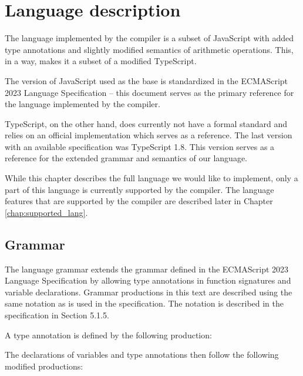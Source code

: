 \chapter{Language description}\label{language}

The language implemented by the compiler is a subset of JavaScript with added type annotations and slightly modified semantics of arithmetic operations. This, in a way, makes it a subset of a modified TypeScript.

The version of JavaScript used as the base is standardized in the ECMAScript 2023 Language Specification\cite{ecma262} -- this document serves as the primary reference for the language implemented by the compiler.

TypeScript, on the other hand, does currently not have a formal standard and relies on an official implementation which serves as a reference. The last version with an available specification was TypeScript 1.8\cite{typescript18}. This version serves as a reference for the extended grammar and semantics of our language.

While this chapter describes the full language we would like to implement, only a part of this language is currently supported by the compiler. The language features that are supported by the compiler are described later in Chapter \ref{chap:supported_lang}.


\section{Grammar}\label{lang:grammar}

The language grammar extends the grammar defined in the ECMAScript 2023 Language Specification\cite{ecma262} by allowing type annotations in function signatures and variable declarations. Grammar productions in this text are described using the same notation as is used in the specification. The notation is described in the specification in Section 5.1.5.

A type annotation is defined by the following production:

\GrammarRule[TypeAnnotation]{}{
    \terminal{:} \nonterminal[Identifier]{}{}
}


The declarations of variables and type annotations then follow the following modified productions:




